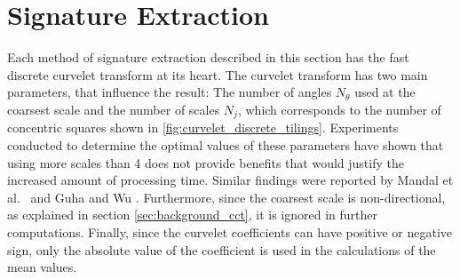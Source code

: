 \section{Signature Extraction}\label{sec:solution_signature_extraction}

Each method of signature extraction described in this section has the fast
discrete curvelet transform at its heart. The curvelet transform has two main
parameters, that influence the result: The number of angles $N_{\theta}$ used
at the coarsest scale and the number of scales $N_j$, which corresponds to the
number of concentric squares shown in \ref{fig:curvelet_discrete_tilings}.
Experiments conducted to determine the optimal values of these parameters have
shown that using more scales than 4 does not provide benefits that would
justify the increased amount of processing time. Similar findings were reported
by Mandal et al.\ \autocite{mandal_curvelet_2009} and Guha and Wu
\autocite{guha_curvelet_????}. Furthermore, since the coarsest scale is
non-directional, as explained in section \ref{sec:background_cct}, it is
ignored in further computations. Finally, since the curvelet coefficients can
have positive or negative sign, only the absolute value of the coefficient is
used in the calculations of the mean values.

